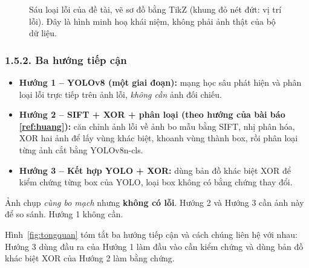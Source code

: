 \documentclass[11pt,a4paper]{article}
\newcommand{\tlr}[1]{\ref{ref:#1}}
\newcommand{\chude}[1]{\subsubsection*{#1}}
\begin{document}
\begin{figure}[H]
\caption{Sáu loại lỗi của đề tài, vẽ sơ đồ bằng TikZ (khung đỏ nét đứt: vị trí lỗi). Đây là hình minh hoạ khái niệm, không phải ảnh thật của bộ dữ liệu.}
\label{fig:sauloi}
\end{figure}


\chude{1.5.2. Ba hướng tiếp cận}

\begin{itemize}
  \item \textbf{Hướng 1 -- YOLOv8 (một giai đoạn):} mạng học sâu phát hiện và phân loại lỗi trực tiếp trên ảnh lỗi, \emph{không cần} ảnh đối chiếu.
  \item \textbf{Hướng 2 -- SIFT + XOR + phân loại (theo hướng của bài báo \tlr{huang}):} căn chỉnh ảnh lỗi về ảnh bo mẫu bằng SIFT, nhị phân hóa, XOR hai ảnh để lấy vùng khác biệt, khoanh vùng thành box, rồi phân loại từng ảnh cắt bằng YOLOv8n-cls.
  \item \textbf{Hướng 3 -- Kết hợp YOLO + XOR:} dùng bản đồ khác biệt XOR để kiểm chứng từng box của YOLO, loại box không có bằng chứng thay đổi.
\end{itemize}

\begin{dnghia}[title={Ảnh bo mẫu (template)}]
Ảnh chụp \emph{cùng bo mạch} nhưng \textbf{không có lỗi}. Hướng 2 và Hướng 3 cần ảnh này để so sánh. Hướng 1 không cần.
\end{dnghia}

Hình~\ref{fig:tongquan} tóm tắt ba hướng tiếp cận và cách chúng liên hệ với nhau: Hướng 3 dùng đầu ra của Hướng 1 làm đầu vào cần kiểm chứng và dùng bản đồ khác biệt XOR của Hướng 2 làm bằng chứng.
\end{document}
